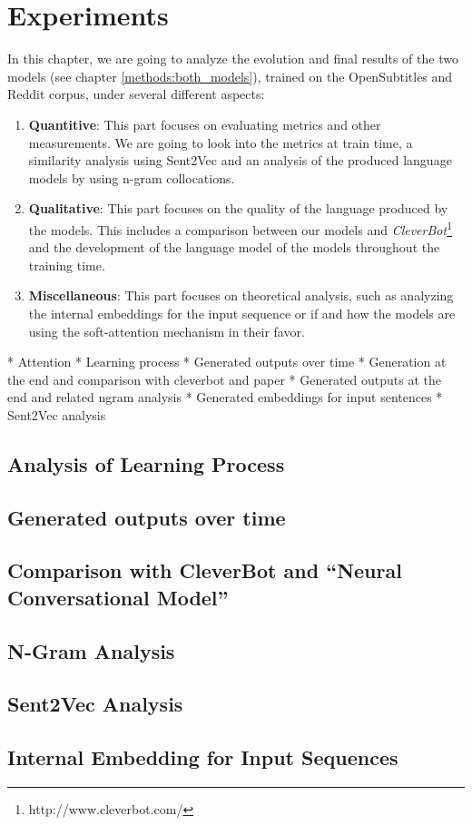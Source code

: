 \chapter{Experiments}
In this chapter, we are going to analyze the evolution and final results of the two models (see chapter \ref{methods:both_models}), trained on the OpenSubtitles and Reddit corpus, under several different aspects:

\begin{enumerate}[noitemsep]
	\item \textbf{Quantitive}: This part focuses on evaluating metrics and other measurements. We are going to look into the metrics at train time, a similarity analysis using Sent2Vec and an analysis of the produced language models by using n-gram collocations.
	\item \textbf{Qualitative}: This part focuses on the quality of the language produced by the models. This includes a comparison between our models and \emph{CleverBot}\footnote{http://www.cleverbot.com/} and the development of the language model of the models throughout the training time.
	\item \textbf{Miscellaneous}: This part focuses on theoretical analysis, such as analyzing the internal embeddings for the input sequence or if and how the models are using the soft-attention mechanism in their favor.
\end{enumerate}
\blindtext

* Attention
* Learning process
* Generated outputs over time
* Generation at the end and comparison with cleverbot and paper
* Generated outputs at the end and related ngram analysis
* Generated embeddings for input sentences
* Sent2Vec analysis


\section{Analysis of Learning Process}
\blindtext

\section{Generated outputs over time}
\blindtext

\section{Comparison with CleverBot and ``Neural Conversational Model''}
\blindtext

\section{N-Gram Analysis}
\blindtext

\section{Sent2Vec Analysis}
\blindtext

\section{Internal Embedding for Input Sequences}
\blindtext